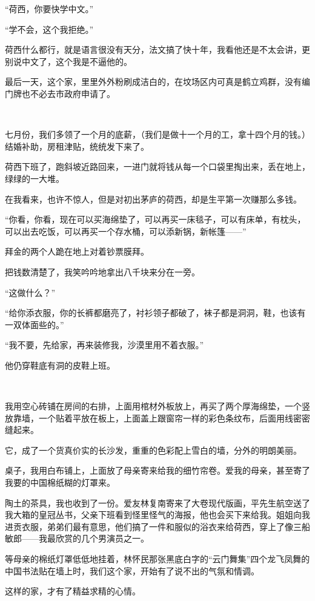 \par “荷西，你要快学中文。”
\par “学不会，这个我拒绝。”
\par 荷西什么都行，就是语言很没有天分，法文搞了快十年，我看他还是不太会讲，更别说中文了，这个我是不逼他的。
\par 最后一天，这个家，里里外外粉刷成洁白的，在坟场区内可真是鹤立鸡群，没有编门牌也不必去市政府申请了。
\par  
\par 七月份，我们多领了一个月的底薪，（我们是做十一个月的工，拿十四个月的钱。）结婚补助，房租津贴，统统发下来了。
\par 荷西下班了，跑斜坡近路回来，一进门就将钱从每一个口袋里掏出来，丢在地上，绿绿的一大堆。
\par 在我看来，也许不惊人，但是对初出茅庐的荷西，却是生平第一次赚那么多钱。
\par “你看，你看，现在可以买海绵垫了，可以再买一床毯子，可以有床单，有枕头，可以出去吃饭，可以再买一个存水桶，可以添新锅，新帐篷——”
\par 拜金的两个人跪在地上对着钞票膜拜。
\par 把钱数清楚了，我笑吟吟地拿出八千块来分在一旁。
\par “这做什么？”
\par “给你添衣服，你的长裤都磨亮了，衬衫领子都破了，袜子都是洞洞，鞋，也该有一双体面些的。”
\par “我不要，先给家，再来装修我，沙漠里用不着衣服。”
\par 他仍穿鞋底有洞的皮鞋上班。
\par  
\par 我用空心砖铺在房间的右排，上面用棺材外板放上，再买了两个厚海绵垫，一个竖放靠墙，一个贴着平放在板上，上面盖上跟窗帘一样的彩色条纹布，后面用线密密缝起来。
\par 它，成了一个货真价实的长沙发，重重的色彩配上雪白的墙，分外的明朗美丽。
\par 桌子，我用白布铺上，上面放了母亲寄来给我的细竹帘卷。爱我的母亲，甚至寄了我要的中国棉纸糊的灯罩来。
\par 陶土的茶具，我也收到了一份。爱友林复南寄来了大卷现代版画，平先生航空送了我大箱的皇冠丛书，父亲下班看到怪里怪气的海报，他也会买下来给我。姐姐向我进贡衣服，弟弟们最有意思，他们搞了一件和服似的浴衣来给荷西，穿上了像三船敏郎——我最欣赏的几个男演员之一。
\par 等母亲的棉纸灯罩低低地挂着，林怀民那张黑底白字的“云门舞集”四个龙飞凤舞的中国书法贴在墙上时，我们这个家，开始有了说不出的气氛和情调。
\par 这样的家，才有了精益求精的心情。
